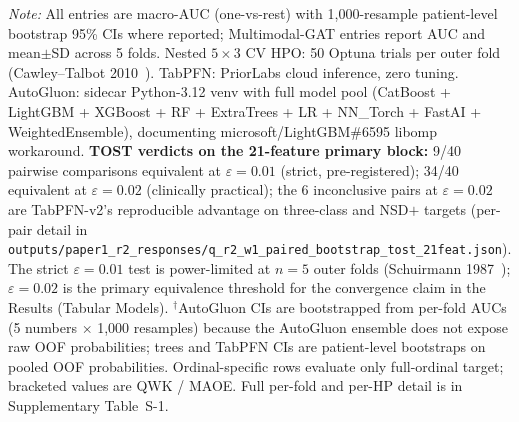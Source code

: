 \documentclass[10pt,letterpaper]{article}
\begin{document}
\begin{table}[!t]
\raggedright\scriptsize\textit{Note:} All entries are macro-AUC (one-vs-rest) with 1,000-resample patient-level bootstrap 95\% CIs where reported; Multimodal-GAT entries report AUC and mean$\pm$SD across 5 folds. Nested $5{\times}3$ CV HPO: 50 Optuna trials per outer fold (Cawley--Talbot 2010~\cite{cawleytalbot2010}). TabPFN: PriorLabs cloud inference, zero tuning. AutoGluon: sidecar Python-3.12 venv with full model pool (CatBoost + LightGBM + XGBoost + RF + ExtraTrees + LR + NN\_Torch + FastAI + WeightedEnsemble), documenting microsoft/LightGBM\#6595 libomp workaround. \textbf{TOST verdicts on the 21-feature primary block:} 9/40 pairwise comparisons equivalent at $\varepsilon{=}0.01$ (strict, pre-registered); 34/40 equivalent at $\varepsilon{=}0.02$ (clinically practical); the 6 inconclusive pairs at $\varepsilon{=}0.02$ are TabPFN-v2's reproducible advantage on three-class and NSD$+$ targets (per-pair detail in \texttt{outputs/paper1\_r2\_responses/q\_r2\_w1\_paired\_bootstrap\_tost\_21feat.json}). The strict $\varepsilon{=}0.01$ test is power-limited at $n{=}5$ outer folds (Schuirmann 1987~\cite{schuirmann1987}); $\varepsilon{=}0.02$ is the primary equivalence threshold for the convergence claim in the Results (Tabular Models). $^{\dagger}$AutoGluon CIs are bootstrapped from per-fold AUCs (5 numbers $\times$ 1{,}000 resamples) because the AutoGluon ensemble does not expose raw OOF probabilities; trees and TabPFN CIs are patient-level bootstraps on pooled OOF probabilities. Ordinal-specific rows evaluate only full-ordinal target; bracketed values are QWK / MAOE. Full per-fold and per-HP detail is in Supplementary Table~S-1.
\end{table}
\end{document}

